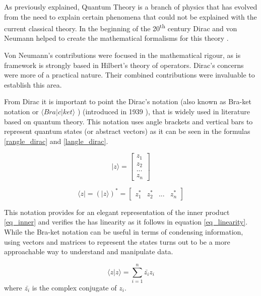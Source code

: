 As previously explained, Quantum Theory is a branch of physics that has evolved from the need to explain certain phenomena that could not be explained with the current classical theory.
In the beginning of the 20\textsuperscript{th} century Dirac and von Neumann  helped to create the mathematical formalisms for this theory \cite{sep-qt-nvd}\cite{Summers2006}. 

Von Neumann's contributions were focused in the mathematical rigour, as is framework is strongly based in Hilbert's theory of operators. Dirac's concerns were more of a practical nature. Their combined contributions were invaluable to establish this area. 

From Dirac it is important to point the Dirac's notation (also known as Bra-ket notation or  $\langle Bra\vert c\vert ket\rangle$ ) (introduced in 1939 \cite{sep-qt-nvd}), that is widely used in literature based on quantum theory. This notation uses angle brackets and vertical bars to represent quantum states (or abstract vectors) as it can be seen in the formulas \eqref{rangle_dirac} and \eqref{langle_dirac}. 

\begin{equation}
\label{rangle_dirac}
\vert z\rangle = \left[\begin{array}{c}
z_{1}\\
z_{2}\\
...\\
z_{n}
\end{array}\right]
\end{equation}

\begin{equation}
\label{langle_dirac}
\langle z\vert= ( \vert z\rangle )^*  =\left[\begin{array}{cccc}
z_{1}^{*} & z_{2}^{*} & ... & z_{n}^{*}\end{array}\right]
\end{equation}




This notation provides for an elegant representation of the inner product \eqref{eq_inner} and verifies the has linearity as it follows in equation \eqref{eq_linearity}. While the Bra-ket notation can be useful in terms of condensing information, using vectors and matrices to represent the states turns out to be a more approachable way to understand and manipulate data.
 

\begin{equation}
\label{eq_inner}
\langle z\vert z\rangle={\displaystyle \sum_{i=1}^{n}\bar{z_{i}}z_{i}}
\end{equation}
where $\bar{z_{i}}$ is the complex conjugate of $z_{i}$.

